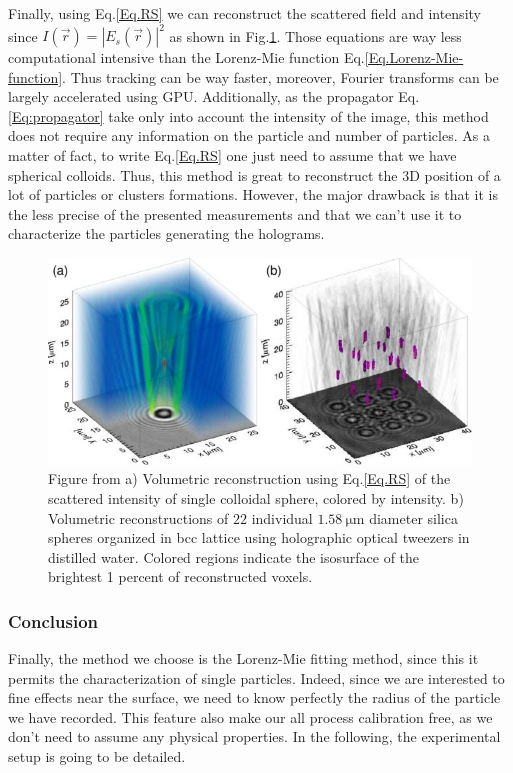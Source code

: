 Finally, using Eq.\ref{Eq.RS} we can reconstruct the scattered field and intensity since $I(\vec{r}) = |E_s(\vec{r})|^2$ as shown in Fig.\ref{fig.sommerfeld}. 
Those equations are way less computational intensive than the Lorenz-Mie function Eq.\ref{Eq.Lorenz-Mie-function}. Thus tracking can be way faster, moreover, Fourier transforms can be largely accelerated using GPU. Additionally, as the propagator Eq.\ref{Eq:propagator} take only into account the intensity of the image, this method does not require any information on the particle and number of particles. As a matter of fact,   to write Eq.\ref{Eq.RS} one just need to assume that we have spherical colloids. Thus, this method is great to reconstruct the 3D position of a lot of particles or clusters formations. However, the major drawback is that it is the less precise of the presented measurements and that we can't use it to characterize the particles generating the holograms.

\begin{figure}[!ht]
	\centering
	\includegraphics[scale=2]{02_body/chapter2/images/sommerfel_demo.jpg}
	\caption{Figure from \cite{cheong_strategies_2010} a) Volumetric reconstruction using Eq.\ref{Eq.RS} of the scattered intensity of single colloidal sphere, colored by intensity. b) Volumetric reconstructions of $22$ individual $1.58 ~ \mathrm{\mu m}$ diameter silica spheres organized in bcc lattice using holographic optical tweezers in distilled water. Colored regions indicate the isosurface of the brightest 1 percent of reconstructed voxels.}
	\label{fig.sommerfeld}
\end{figure}



\subsubsection{Conclusion}

Finally, the method we choose is the Lorenz-Mie fitting method, since this it permits the characterization of single particles. Indeed, since we are interested to fine effects near the surface, we need to know perfectly the radius of the particle we have recorded. This feature also make our all process calibration free, as we don't need to assume any physical properties. In the following, the experimental setup is going to be detailed.


